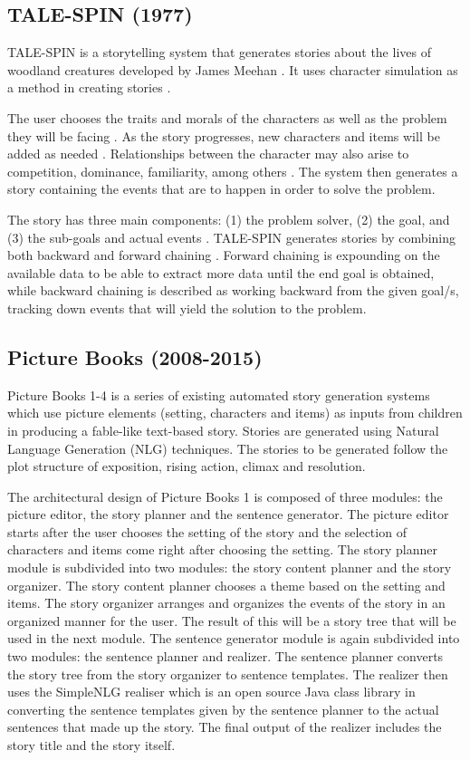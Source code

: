 \subsection{TALE-SPIN (1977)}
TALE-SPIN is a storytelling system that generates stories about the lives of  woodland creatures developed by James Meehan \cite{Gervas2009}. It uses character simulation as a method in creating stories \cite{Mawhorter2013}.

The user chooses the traits and morals of the characters as well as the problem they will be facing \cite{Gervas2009, Meehan1977}. As the story progresses, new characters and items will be added as needed \cite{Meehan1977}. Relationships between the character may also arise to competition, dominance, familiarity, among others \cite{Gervas2009}. The system then generates a story containing the events that are to happen in order to solve the problem.

The story has three main components: (1) the problem solver, (2) the goal, and (3) the sub-goals and actual events \cite{Meehan1977}. TALE-SPIN generates stories by combining both backward and forward chaining \cite{Meehan1977}. Forward chaining is expounding on the available data to be able to extract more data until the end goal is obtained, while backward chaining is described as working backward from the given goal/s, tracking down events that will yield the solution to the problem.

\subsection{Picture Books (2008-2015)}
Picture Books 1-4 is a series of existing automated story generation systems which use picture elements (setting, characters and items) as inputs from children in producing a fable-like text-based story. Stories are generated using Natural Language Generation (NLG) techniques. The stories to be generated follow the plot structure of exposition, rising action, climax and resolution.

The architectural design of Picture Books 1 is composed of three modules: the picture editor, the story planner and the sentence generator. The picture editor starts after the user chooses the setting of the story and the selection of characters and items come right after choosing the setting. The story planner module is subdivided into two modules: the story content planner and the story organizer. The story content planner chooses a theme based on the setting and items. The story organizer arranges and organizes the events of the story in an organized manner for the user. The result of this will be a story tree that will be used in the next module.  The sentence generator module is again subdivided into two modules: the sentence planner and realizer. The sentence planner converts the story tree from the story organizer to sentence templates. The realizer then uses the SimpleNLG realiser which is an open source Java class library in converting the sentence templates given by the sentence planner to the actual sentences that made up the story. The final output of the realizer includes the story title and the story itself.

